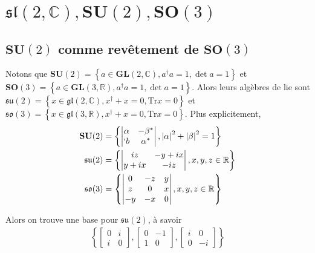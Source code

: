 \documentclass[10pt]{report}
\newcommand{\abs}[1]{\left|#1\right|}
\begin{document}
\section{$\mathfrak{sl}(2,\mathbb{C}),\mathbf{SU}(2), \mathbf{SO}(3)$ }

\subsection{$\mathbf{SU}(2)$ comme rev\^etement de $\mathbf{SO}(3)$}

Notons que $\mathbf{SU}(2) = \left\{ a \in \mathbf{GL}(2,\mathbb{C}), a^\dagger a = 1, \det a = 1 \right\}$ et $\mathbf{SO}(3) = \left\{ a \in \mathbf{GL}(3,\mathbb{R}), a^\dagger a = 1, \det a = 1 \right\}$. Alors leurs alg\`ebres de lie sont $\mathfrak{su}(2) = \left\{ x \in \mathfrak{gl}(2, \mathbb{C}), x^\dagger + x = 0, \mathrm{Tr} x = 0 \right\}$ et $\mathfrak{so}(3) = \left\{ x \in \mathfrak{gl}(3,\mathbb{R}), x^\dagger + x = 0, \mathrm{Tr} x = 0 \right\}$. Plus explicitement, 
\begin{align}
    \mathbf{SU}(2) &= \left\{ \begin{vmatrix}\alpha & -\beta^*\\`b & \alpha^*\end{vmatrix}, \abs{\alpha}^2 + \abs{\beta}^2 = 1 \right\}\\
    \mathfrak{su}(2) &= \left\{ \begin{vmatrix}iz & -y + ix \\ y + ix & -iz \end{vmatrix}, x,y,z \in \mathbb{R}\right\}\\
    \mathfrak{so}(3) &= \left\{ \begin{vmatrix}0& -z & y\\z & 0 & x\\-y & -x & 0\end{vmatrix},x,y,z \in \mathbb{R} \right\}
\end{align}

Alors on trouve une base pour $\mathfrak{su}(2)$, \`a savoir
\begin{align}
    \left\{ \begin{bmatrix} 0 & i\\i & 0 \end{bmatrix}, \begin{bmatrix} 0 & -1\\1 & 0 \end{bmatrix} , \begin{bmatrix} i & 0\\0 & -i \end{bmatrix}  \right\}
\end{align}
\end{document}
